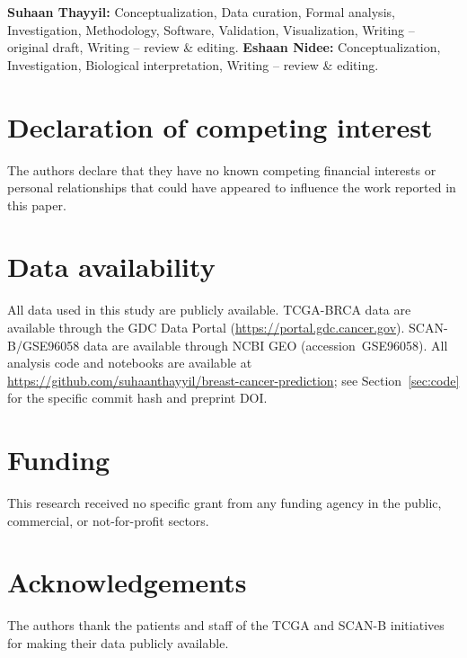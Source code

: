 \documentclass[review,12pt]{elsarticle}
\begin{document}
\textbf{Suhaan Thayyil:} Conceptualization, Data curation, Formal
analysis, Investigation, Methodology, Software, Validation,
Visualization, Writing -- original draft, Writing -- review \& editing.
\textbf{Eshaan Nidee:} Conceptualization, Investigation, Biological
interpretation, Writing -- review \& editing.

\section*{Declaration of competing interest}

The authors declare that they have no known competing financial interests
or personal relationships that could have appeared to influence the work
reported in this paper.

\section*{Data availability}

All data used in this study are publicly available.  TCGA-BRCA data
are available through the GDC Data Portal
(\url{https://portal.gdc.cancer.gov}).  SCAN-B/GSE96058 data are
available through NCBI GEO (accession~GSE96058).  All analysis code
and notebooks are available at \url{https://github.com/suhaanthayyil/breast-cancer-prediction};
see Section~\ref{sec:code} for the specific commit hash and preprint DOI.

\section*{Funding}

This research received no specific grant from any funding agency in the
public, commercial, or not-for-profit sectors.

\section*{Acknowledgements}

The authors thank the patients and staff of the TCGA and SCAN-B
initiatives for making their data publicly available.



\end{document}
